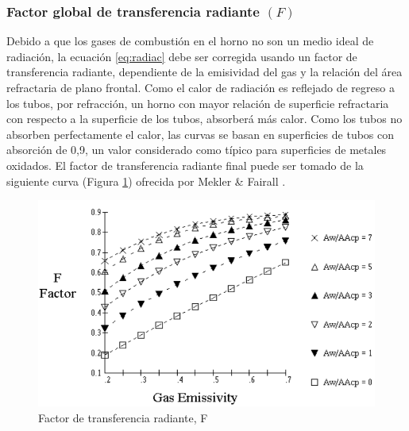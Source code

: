 \subsubsection{Factor global de transferencia radiante $(F)$}
\par Debido a que los gases de combustión en el horno no son un medio ideal de radiación, la ecuación \ref{eq:radiac} debe ser corregida usando un factor de transferencia radiante, dependiente de la emisividad del gas y la relación del área refractaria de plano frontal. Como el calor de radiación es reflejado de regreso a los tubos, por refracción, un horno con mayor relación de superficie refractaria con respecto a la superficie de los tubos, absorberá más calor. Como los tubos no absorben perfectamente el calor, las curvas se basan en superficies de tubos con absorción de 0,9, un valor considerado como típico para superficies de metales oxidados. El factor de transferencia radiante final puede ser tomado de la siguiente curva (Figura \ref{fig:f}) ofrecida por Mekler \& Fairall \cite{bib:mekler}.
\begin{figure}[H]
\begin{center}
\includegraphics[scale=0.45]{images/f}
\caption[Factor de transferencia radiante, F]{Factor de transferencia radiante, F \cite{bib:mekler}}
\label{fig:f}
\end{center}
\end{figure}

